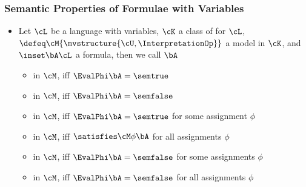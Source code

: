 \documentclass[notes,mh]{mikoslides}
\begin{document}
\begin{module}[id=semantics-base]

\begin{frame}
  \frametitle{Semantic Properties of Formulae with Variables}
  \begin{itemize}
  \item 
    \begin{definition}[id=semantic-properties.def,for={semtrue,semfalse}]
      Let $\cL$ be a language with variables, $\cK$ a class of  for
      $\cL$, $\defeq\cM{\mvstructure{\cU,\InterpretationOp}}$ a model in $\cK$, and
      $\inset\bA\cL$ a formula, then we call $\bA$
      \begin{itemize}
      \item {} in $\cM$, iff
        $\EvalPhi\bA=\semtrue$
      \item {} in $\cM$, iff
        $\EvalPhi\bA=\semfalse$
      \item {} in $\cM$, iff $\EvalPhi\bA=\semtrue$ for some assignment
        $\phi$
      \item {} in $\cM$, iff $\satisfies\cM\phi\bA$ for all
        assignments $\phi$
      \item {} in $\cM$, iff $\EvalPhi\bA=\semfalse$ for some
        assignments $\phi$
      \item {} in $\cM$, iff $\EvalPhi\bA=\semfalse$ for all
        assignments $\phi$
      \end{itemize}
    \end{definition}
  \end{itemize}
\end{frame}
\end{module}
\end{document}
